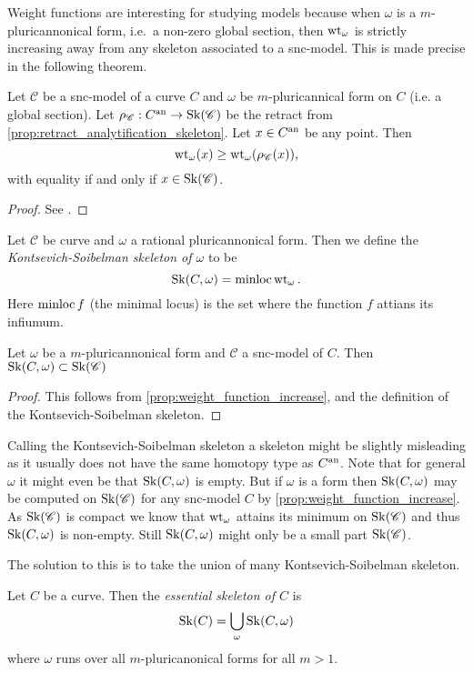 Weight functions are interesting for studying models because when $\omega$ is a $m$-pluricannonical form, i.e.\ a non-zero global section, then $\operatorname{wt}_\omega$ is strictly increasing away from any skeleton associated to a snc-model. 
This is made precise in the following theorem. 
\begin{proposition}\label{prop:weight_function_increase}
	Let $\mathscr C$ be a snc-model of a curve $C$ and $\omega$ be $m$-pluricannical form on $C$ (i.e. a global section).
	Let $\rho_{\mathscr C}: C{}^{\text{an}} \to \operatorname{Sk}(\mathscr C)$ be the retract from \cref{prop:retract_analytification_skeleton}. 
	Let $x \in C{}^{\text{an}} $ be any point. 
	Then \[
		\operatorname{wt}_\omega(x) \ge \operatorname{wt}_\omega(\rho_{\mathscr C}(x))
	,\] 
	with equality if and only if $x \in \operatorname{Sk}(\mathscr C)$. 
\end{proposition}
\begin{proof}
	See \cite[prop.\ 4.4.4]{mustataWeightFunctionsNonArchimedean2015}. 
\end{proof}

\begin{definition}\label{def:KS_skeleton}
	Let $\mathscr C $ be curve and $\omega$ a rational pluricannonical form. 
	Then we define the \emph{Kontsevich-Soibelman skeleton of $\omega$} to be \[
		\operatorname{Sk}(C, \omega) = \operatorname{minloc} \operatorname{wt}_{\omega}
	.\]  
	Here $\operatorname{minloc} f$ (the minimal locus) is the set where the function $f$ attians its infiumum.
\end{definition}
\begin{lemma}
	Let $\omega$ be a $m$-pluricannonical form and $\mathscr C$ a snc-model of $C$. 
	Then $\operatorname{Sk}(C, \omega) \subset  \operatorname{Sk}(\mathscr C)$
\end{lemma}
\begin{proof}
	This follows from \cref{prop:weight_function_increase}, and the definition of the Kontsevich-Soibelman skeleton. 
\end{proof}
Calling the Kontsevich-Soibelman skeleton a skeleton might be slightly misleading as it usually does not have the same homotopy type as $C{}^{\text{an}}$. 
Note that for general $\omega$ it might even be that $\operatorname{Sk}(C, \omega)$ is empty. 
But if $\omega$ is a form then $\operatorname{Sk}(C, \omega)$ may be computed on $\operatorname{Sk} (\mathscr C)$ for any snc-model $C$ by \cref{prop:weight_function_increase}. 
As $\operatorname{Sk}(\mathscr C)$ is compact we know that $\operatorname{wt}_{\omega}$ attains its minimum on $\operatorname{Sk}(\mathscr C)$ and thus $\operatorname{Sk}(C, \omega)$ is non-empty. 
Still $\operatorname{Sk}(C, \omega)$ might only be a small part $\operatorname{Sk}(\mathscr C)$. 

The solution to this is to take the union of many Kontsevich-Soibelman skeleton.
\begin{definition}
	Let $C$ be a curve. 
	Then the \emph{essential skeleton of $C$} is \[
		\operatorname{Sk}(C) = \bigcup_{\omega} \operatorname{Sk}(C, \omega)
	\] 
	where $\omega$ runs over all $m$-pluricanonical forms for all $m > 1$. 
\end{definition}

